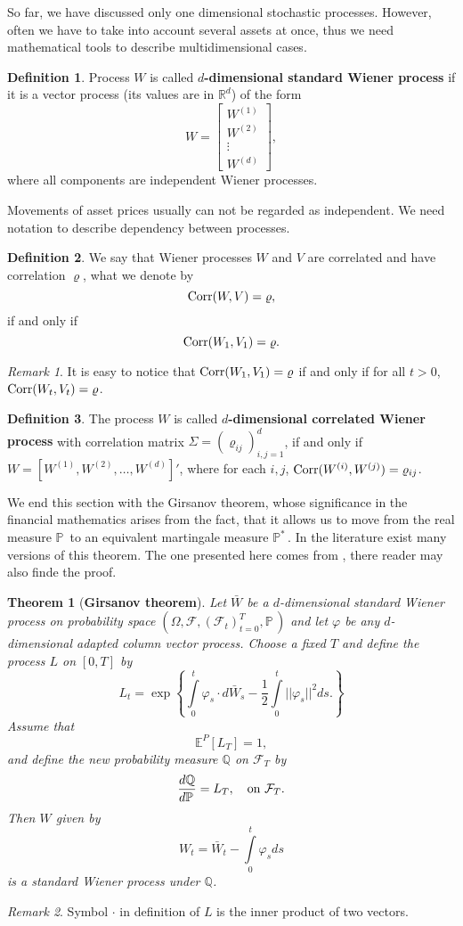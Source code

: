 \documentclass[a4paper,12pt, oneside]{book}
\newtheorem{thm}{Theorem}[chapter]
\theoremstyle{definition}
\newtheorem{mydef}{Definition}[chapter]
\theoremstyle{remark}
\newtheorem{remark}{Remark}[chapter]
\def\E{{\mathbb{E}}}
\def\P{{\mathbb{P}}\,}
\def\Corr{{\hbox{Corr}}}
\def\Pm{{\mathbb{P}}^*\,}
\begin{document}
So far, we have discussed only one dimensional stochastic processes. However, often we have to take into account several assets at once, thus we need mathematical tools to describe multidimensional cases.
\begin{mydef}
 Process $W$ is called \textbf{$d$-dimensional standard Wiener process} if it is a vector process (its values are in $\mathbb{R}^d$) of the form
 \[ W = \left[ \begin{array}{c}
         W^{(1)}\\
         W^{(2)}\\
         \vdots\\
         W^{(d)}
        \end{array} \right],\]
where all components are independent Wiener processes.
\end{mydef}
Movements of asset prices usually can not be regarded as independent. We need notation to describe dependency between processes.
\begin{mydef}
 We say that Wiener processes $W$ and $V$ are correlated and have correlation $\varrho$, what we denote by
 \[ \Corr(W, V) = \varrho, \]
 if and only if
 \[ \Corr(W_1, V_1) = \varrho. \]
\end{mydef}
\begin{remark}
 It is easy to notice that $\Corr(W_1, V_1) = \varrho$ if and only if for all $t > 0$, $\Corr(W_t, V_t) = \varrho$.
\end{remark}
\begin{mydef}
 The process $W$ is called \textbf{$d$-dimensional correlated Wiener process} with correlation matrix $\Sigma = (\varrho_{ij})_{i,j=1}^d$, if and only if $W = [W^{(1)},W^{(2)},\ldots,W^{(d)}]'$, where for each $i,j$, $\Corr(W^{(i)}, W^{(j)}) = \varrho_{ij}$.   
\end{mydef}

We end this section with the Girsanov theorem, whose significance in the financial mathematics arises from the fact, that it allows us to move from the real measure $\P$ to an equivalent martingale measure $\Pm$. In the literature exist many versions of this theorem. The one presented here comes from \cite{bjork}, there reader may also finde the proof.
\begin{thm}[\bfseries Girsanov theorem]
 \label{thm:girsanov}
 Let $\bar{W}$ be a $d$-dimensional standard Wiener process on probability space $(\Omega, \mathcal{F}, (\mathcal{F}_t)_{t=0}^T, \P)$ and let $\varphi$ be any $d$-dimensional adapted column vector process.
 Choose a fixed $T$ and define the process $L$ on $[0,T]$ by
 \[ L_t = \exp\left\{ \int\limits_0^t \varphi_s \cdot d\bar{W}_s - \frac{1}{2}\int\limits_0^t ||\varphi_s||^2ds. \right\} \]
 Assume that 
 \[ \E^P[L_T] = 1, \]
 and define the new probability measure $\mathbb{Q}$ on $\mathcal{F}_T$ by
 \[ \frac{d\mathbb{Q}}{d\P} = L_T,\ \ \hbox{ on } \mathcal{F}_T. \]
 Then $W$ given by
 \[W_t = \bar{W}_t - \int\limits_0^t \varphi_s ds\]
 is a standard Wiener process under $\mathbb{Q}$.
\end{thm}
\begin{remark}
 Symbol $\cdot$ in definition of $L$ is the inner product of two vectors. 
\end{remark}
\end{document}
